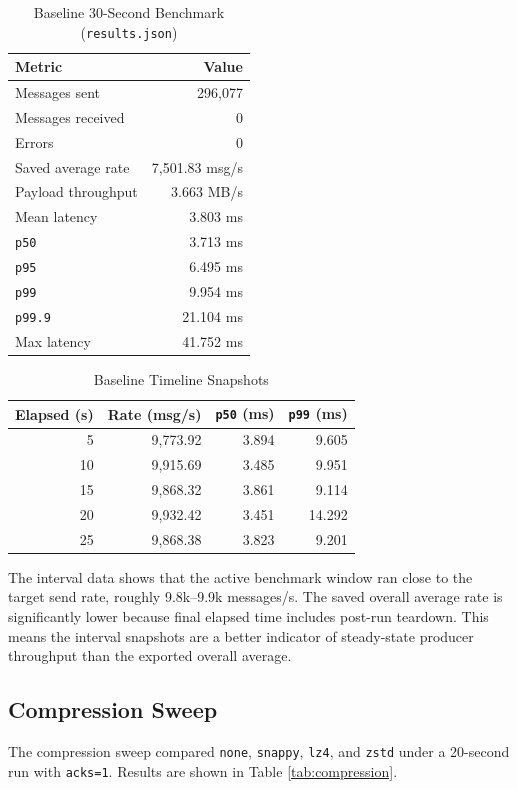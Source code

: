 \documentclass[conference]{IEEEtran}
\begin{document}
\begin{table}[t]
\caption{Baseline 30-Second Benchmark (\texttt{results.json})}
\label{tab:baseline}
\centering
\begin{tabular}{lr}
\toprule
Metric & Value \\
\midrule
Messages sent & 296{,}077 \\
Messages received & 0 \\
Errors & 0 \\
Saved average rate & 7{,}501.83 msg/s \\
Payload throughput & 3.663 MB/s \\
Mean latency & 3.803 ms \\
\texttt{p50} & 3.713 ms \\
\texttt{p95} & 6.495 ms \\
\texttt{p99} & 9.954 ms \\
\texttt{p99.9} & 21.104 ms \\
Max latency & 41.752 ms \\
\bottomrule
\end{tabular}
\end{table}

\begin{table}[t]
\caption{Baseline Timeline Snapshots}
\label{tab:timeline}
\centering
\begin{tabular}{rrrr}
\toprule
Elapsed (s) & Rate (msg/s) & \texttt{p50} (ms) & \texttt{p99} (ms) \\
\midrule
5 & 9{,}773.92 & 3.894 & 9.605 \\
10 & 9{,}915.69 & 3.485 & 9.951 \\
15 & 9{,}868.32 & 3.861 & 9.114 \\
20 & 9{,}932.42 & 3.451 & 14.292 \\
25 & 9{,}868.38 & 3.823 & 9.201 \\
\bottomrule
\end{tabular}
\end{table}

The interval data shows that the active benchmark window ran close to the target send rate, roughly 9.8k--9.9k messages/s. The saved overall average rate is significantly lower because final elapsed time includes post-run teardown. This means the interval snapshots are a better indicator of steady-state producer throughput than the exported overall average.

\subsection{Compression Sweep}
The compression sweep compared \texttt{none}, \texttt{snappy}, \texttt{lz4}, and \texttt{zstd} under a 20-second run with \texttt{acks=1}. Results are shown in Table \ref{tab:compression}.
\end{document}

